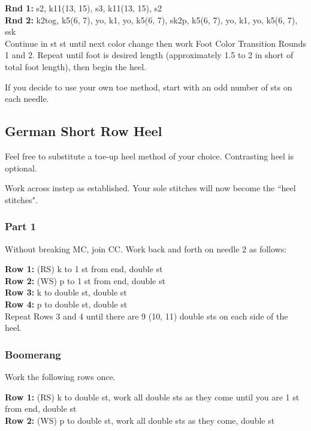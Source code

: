 \documentclass[12pt]{article}
\newcommand{\rowDir}[1]{\textbf{#1:}} %
\newenvironment{frnote}
    {%
    	\setlength{\FrameRule}{1.5pt}
    	\def\FrameCommand{\fboxrule=\FrameRule\fboxsep=\FrameSep \fcolorbox{framecolor}{shadecolor}}
    	\MakeFramed {\FrameRestore}}
    {\setlength{\FrameRule}{1pt}
	\endMakeFramed}
\begin{document}
\begin{multicols}{2}
\rowDir{Rnd 1} s2, k11(13, 15), s3, k11(13, 15), s2 \\
\rowDir{Rnd 2} k2tog, k5(6, 7), yo, k1, yo, k5(6, 7), sk2p, k5(6, 7), yo, k1, yo, k5(6, 7), ssk \\

Continue in st st until next color change then work Foot Color Transition Rounds 1 and 2. Repeat until foot is desired length (approximately 1.5 to 2 in short of total foot length), then begin the heel.

\vfill
\columnbreak

\begin{frnote} \small
If you decide to use your own toe method, start with an odd number of sts on each needle.
\end{frnote}

\vspace{-1.5em}

\subsection*{German Short Row Heel}

Feel free to substitute a toe-up heel method of your choice. Contrasting heel is optional.

Work across instep as established. Your sole stitches will now become the ``heel stitches". 

\subsubsection*{Part 1}
Without breaking MC, join CC. Work back and forth on needle 2 as follows:

\rowDir{Row 1} (RS) k to 1 st from end, double st \\
\rowDir{Row 2} (WS) p to 1 st from end, double st \\
\rowDir{Row 3} k to double st, double st \\
\rowDir{Row 4} p to double st, double st \\

Repeat Rows 3 and 4 until there are 9 (10, 11) double sts on each side of the heel.

\subsubsection*{Boomerang}

Work the following rows once.

\rowDir{Row 1} (RS) k to double st, work all double sts as they come until you are 1 st from end, double st \\
\rowDir{Row 2} (WS) p to double st, work all double sts as they come, double st \\


\end{multicols}
\end{document}
